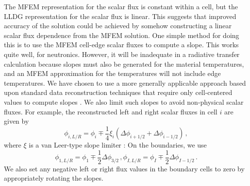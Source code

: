 The MFEM representation for the scalar flux is constant within a cell, but the LLDG representation for the scalar flux is linear.  This suggests that improved 
accuracy of the \SN solution could be achieved by somehow constructing a linear scalar flux dependence from the MFEM solution.  One simple method for doing 
this is to use the MFEM cell-edge scalar fluxes to compute a slope.  This works quite well, for neutronics.  However, it will be inadequate in a radiative 
transfer calculation because slopes must also be generated for the material temperatures, and an MFEM approximation for the temperatures will not include 
edge temperatures.  We have chosen to use a more generally applicable approach based upon standard data reconstruction techniques 
that require only cell-centered values to compute slopes \cite{vanLeer}.  We also limit such slopes to avoid non-physical scalar fluxes.  For example, the reconstructed left and right scalar fluxes in cell $i$ are given by 
	\begin{equation} \label{consistent:reconstruction}
		\phi_{i,L/R} = \phi_i \mp \frac{1}{4} \xi_i \left(\Delta \phi_{i+1/2} + \Delta \phi_{i-1/2}\right) \,,
	\end{equation}
where $\xi$ is a van Leer-type slope limiter \cite{vanLeer}: 
On the boundaries, we use 
	\begin{subequations}
		\begin{equation}
			\phi_{1,L/R} = \phi_1 \mp \frac{1}{2} \Delta \phi_{3/2} \,,
		\end{equation}
		\begin{equation}
			\phi_{I,L/R} = \phi_I \mp \frac{1}{2} \Delta \phi_{I-1/2} \,.
		\end{equation}
	\end{subequations}
We also set any negative left or right flux values in the boundary cells to zero by appropriately rotating the slopes. 